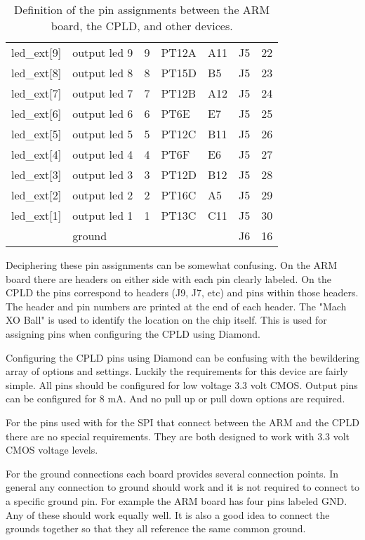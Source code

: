 \documentclass{article}
\begin{document}
\begin{table}
\begin{tabular}{| l | l | l | l | l | l | l |}
		led\_ext[9] & output led 9 & 9 & PT12A & A11  & J5 & 22 \\
		led\_ext[8] & output led 8 & 8 & PT15D & B5   & J5 & 23 \\
		led\_ext[7] & output led 7 & 7 & PT12B & A12  & J5 & 24 \\
		led\_ext[6] & output led 6 & 6 & PT6E  & E7   & J5 & 25 \\
		led\_ext[5] & output led 5 & 5 & PT12C & B11  & J5 & 26 \\
		led\_ext[4] & output led 4 & 4 & PT6F  & E6   & J5 & 27 \\
		led\_ext[3] & output led 3 & 3 & PT12D & B12  & J5 & 28 \\
		led\_ext[2] & output led 2 & 2 & PT16C & A5   & J5 & 29 \\
		led\_ext[1] & output led 1 & 1 & PT13C & C11  & J5 & 30 \\
		          & ground &  & & & J6 & 16 \\
		\hline
	\end{tabular}
	\caption{Definition of the pin assignments between the ARM board,
		the CPLD, and other devices.}
	\label{tbl:pins}
\end{table}

Deciphering these pin assignments can be somewhat confusing.
On the ARM board there are headers on either side with each
pin clearly labeled.
On the CPLD the pins correspond to headers (J9, J7, etc)
and pins within those headers\citep[Pg. 11-14]{EB66}.
The header and pin numbers are printed at the end of each header.
The "Mach XO Ball" is used to identify the location on the
chip itself.
This is used for assigning pins when configuring the CPLD
using Diamond\cite{Diamond}.

Configuring the CPLD pins using Diamond\cite{Diamond} can
be confusing with the bewildering array of options and settings.
Luckily the requirements for this device are fairly simple.
All pins should be configured for low voltage 3.3 volt CMOS.
Output pins can be configured for 8 mA.
And no pull up or pull down options are required.

For the pins used with for the SPI that connect between the
ARM and the CPLD there are no special requirements.
They are both designed to work with 3.3 volt CMOS voltage levels.

For the ground connections each board provides several connection
points.
In general any connection to ground should work and
it is not required to connect to a specific ground pin.
For example the ARM board has four pins labeled GND.
Any of these should work equally well.
It is also a good idea to connect the grounds together so
that they all reference the same common ground.
\end{document}
